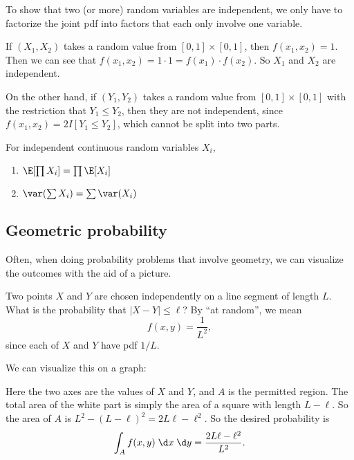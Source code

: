 \documentclass[a4paper]{article}
\begin{document}
To show that two (or more) random variables are independent, we only have to factorize the joint pdf into factors that each only involve one variable.
\begin{eg}
  If $(X_1, X_2)$ takes a random value from $[0, 1] \times [0, 1]$, then $f(x_1, x_2) = 1$. Then we can see that $f(x_1, x_2) = 1\cdot 1 = f(x_1)\cdot f(x_2)$. So $X_1$ and $X_2$ are independent.

  On the other hand, if $(Y_1, Y_2)$ takes a random value from $[0, 1] \times [0, 1]$ with the restriction that $Y_1 \leq Y_2$, then they are not independent, since $f(x_1, x_2) = 2 I[Y_1 \leq Y_2]$, which cannot be split into two parts.
\end{eg}

\begin{prop}
  For independent continuous random variables $X_i$,
  \begin{enumerate}
    \item $\E [\prod X_i] = \prod \E [X_i]$
    \item $\var (\sum X_i) = \sum \var (X_i)$
  \end{enumerate}
\end{prop}

\subsection{Geometric probability}
Often, when doing probability problems that involve geometry, we can visualize the outcomes with the aid of a picture.

\begin{eg}
  Two points $X$ and $Y$ are chosen independently on a line segment of length $L$. What is the probability that $|X - Y| \leq \ell$? By ``at random'', we mean
  \[
    f(x, y) = \frac{1}{L^2},
  \]
  since each of $X$ and $Y$ have pdf $1/L$.

  We can visualize this on a graph:
  \begin{center}
  \end{center}
  Here the two axes are the values of $X$ and $Y$, and $A$ is the permitted region. The total area of the white part is simply the area of a square with length $L - \ell$. So the area of $A$ is $L^2 - (L - \ell)^2 = 2L\ell - \ell^2$. So the desired probability is
  \[
    \int_A f(x, y)\;\d x\;\d y = \frac{2L\ell - \ell^2}{L^2}.
  \]
\end{eg}
\end{document}
